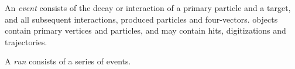 An \textit{event} consists of the decay or interaction of a primary particle and
a target, and all subsequent interactions, produced particles and four-vectors.
 objects contain primary vertices and particles, and may contain
hits, digitizations and trajectories.

A \textit{run} consists of a series of events.

